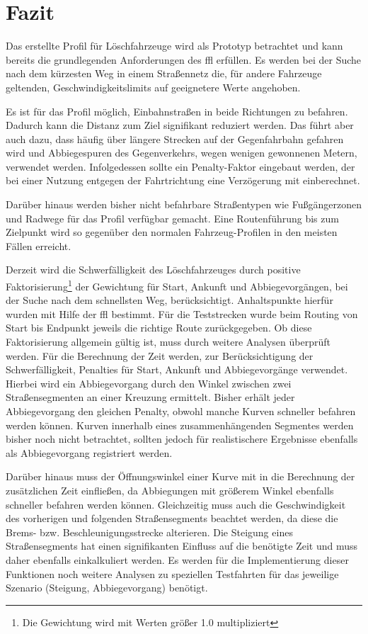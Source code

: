 \section{Fazit}

Das erstellte Profil für Löschfahrzeuge wird als Prototyp betrachtet und kann bereits die grundlegenden Anforderungen des \gls{ffl} erfüllen.
Es werden bei der Suche nach dem kürzesten Weg in einem Straßennetz die, für andere Fahrzeuge geltenden, Geschwindigkeitslimits auf geeignetere Werte angehoben.

Es ist für das Profil möglich, Einbahnstraßen in beide Richtungen zu befahren.
Dadurch kann die Distanz zum Ziel signifikant reduziert werden.
Das führt aber auch dazu, dass häufig über längere Strecken auf der Gegenfahrbahn gefahren wird und Abbiegespuren des Gegenverkehrs, wegen wenigen gewonnenen Metern, verwendet werden.
Infolgedessen sollte ein Penalty-Faktor eingebaut werden, der bei einer Nutzung entgegen der Fahrtrichtung eine Verzögerung mit einberechnet.

Darüber hinaus werden bisher nicht befahrbare Straßentypen wie Fußgängerzonen und Radwege für das Profil verfügbar gemacht.
Eine Routenführung bis zum Zielpunkt wird so gegenüber den normalen Fahrzeug-Profilen in den meisten Fällen erreicht.

Derzeit wird die Schwerfälligkeit des Löschfahrzeuges durch positive Faktorisierung\footnote{Die Gewichtung wird mit Werten größer 1.0 multipliziert} der Gewichtung für Start, Ankunft und Abbiegevorgängen, bei der Suche nach dem schnellsten Weg, berücksichtigt.
Anhaltspunkte hierfür wurden mit Hilfe der \gls{ffl} bestimmt.
Für die Teststrecken wurde beim Routing von Start bis Endpunkt jeweils die richtige Route zurückgegeben.
Ob diese Faktorisierung allgemein gültig ist, muss durch weitere Analysen überprüft werden.
Für die Berechnung der Zeit werden, zur Berücksichtigung der Schwerfälligkeit, Penalties für Start, Ankunft und Abbiegevorgänge verwendet.
Hierbei wird ein Abbiegevorgang durch den Winkel zwischen zwei Straßensegmenten an einer Kreuzung ermittelt.
Bisher erhält jeder Abbiegevorgang den gleichen Penalty, obwohl manche Kurven schneller befahren werden können.
Kurven innerhalb eines zusammenhängenden Segmentes werden bisher noch nicht betrachtet, sollten jedoch für realistischere Ergebnisse ebenfalls als Abbiegevorgang registriert werden.

Darüber hinaus muss der Öffnungswinkel einer Kurve mit in die Berechnung der zusätzlichen Zeit einfließen, da Abbiegungen mit größerem Winkel ebenfalls schneller befahren werden können.
Gleichzeitig muss auch die Geschwindigkeit des vorherigen und folgenden Straßensegments beachtet werden, da diese die Brems- bzw. Beschleunigungsstrecke alterieren.
Die Steigung eines Straßensegments hat einen signifikanten Einfluss auf die benötigte Zeit und muss daher ebenfalls einkalkuliert werden.
Es werden für die Implementierung dieser Funktionen noch weitere Analysen zu speziellen Testfahrten für das jeweilige Szenario (Steigung, Abbiegevorgang) benötigt.

